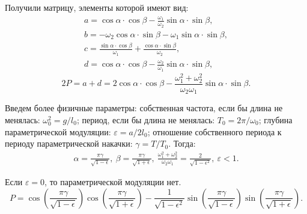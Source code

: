 Получили матрицу, элементы которой имеют вид:
\begin{gather*}
	a=\cos \alpha \cdot \cos \beta -\frac{\omega_1}{\omega_2} \sin \alpha \cdot \sin \beta, \\
	b=-\omega_2 \cos \alpha \cdot \sin \beta - \omega_1 \sin \alpha \cdot \sin \beta, \\
	c=\frac{\sin \alpha \cdot \cos \beta}{\omega_1}+\frac{\cos \alpha \cdot \sin \beta}{\omega_2}, \\
	d=\cos \alpha \cdot \cos \beta-\frac{\omega_2}{\omega_1}\sin \alpha \cdot \sin \beta,
\end{gather*}
\begin{equation}
	2P=a+d=2\cos \alpha\cdot \cos \beta - \frac{\omega_1^2+\omega_2^2}{\omega_2 \omega_1} \sin \alpha \cdot \sin \beta.
	\label{eq:87}	
\end{equation}

Введем более физичные параметры: собственная частота, если бы длина не менялась: $\omega_0^2=g/l_0$; период, если бы длина не менялась: $T_0=2\pi /\omega_0$; глубина параметрической модуляции: $\varepsilon=a/2l_0$; отношение собственного периода к периоду параметрической накачки: $\gamma=T/T_0$. Тогда:
\begin{gather*}
	\alpha=\frac{\pi \gamma}{\sqrt{1-\epsilon}},~\beta=\frac{\pi \gamma}{\sqrt{1+\epsilon}},~\frac{\omega_1^2+\omega_2^2}{\omega_2 \omega_1}=\frac{2}{\sqrt{1-\epsilon^2}},~\varepsilon<1.
\end{gather*}

Если $\varepsilon=0$, то параметрической модуляции нет.
\begin{equation}
	P=\cos(\frac{\pi \gamma}{\sqrt{1-\epsilon}}) \cos (\frac{\pi \gamma}{\sqrt{1+\epsilon}}) - \frac{1}{\sqrt{1-\epsilon^2}} \sin(\frac{\pi \gamma}{\sqrt{1-\epsilon}}) \sin (\frac{\pi \gamma}{\sqrt{1+\epsilon}}).
	\label{eq:88}	
\end{equation}




{}